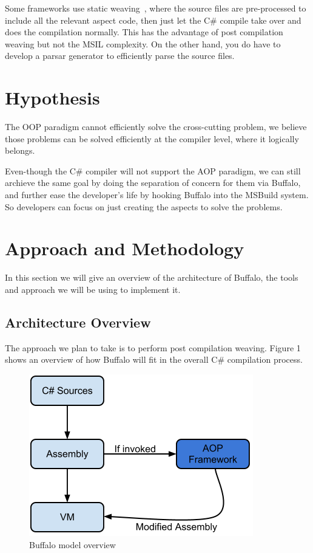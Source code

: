 Some frameworks use static weaving~\cite{aspectcs}, where the source files are pre-processed to include all the relevant aspect code, then just let the C\# compile take over and does the compilation normally. This has the advantage of post compilation weaving but not the MSIL complexity. On the other hand, you do have to develop a parsar generator to efficiently parse the source files.

\section{Hypothesis}
The OOP paradigm cannot efficiently solve the cross-cutting problem, we believe those problems can be solved efficiently at the compiler level, where it logically belongs.

Even-though the C\# compiler will not support the AOP paradigm, we can still archieve the same goal by doing the separation of concern for them via Buffalo, and further ease the developer's life by hooking Buffalo into the MSBuild system. So developers can focus on just creating the aspects to solve the problems.

\section{Approach and Methodology}
In this section we will give an overview of the architecture of Buffalo, the tools and approach we will be using to implement it.

\subsection{Architecture Overview}
The approach we plan to take is to perform post compilation weaving. Figure 1 shows an overview of how Buffalo will fit in the overall C\# compilation process.

\begin{figure}[here]
  \includegraphics[scale=0.70]{model_overview.png}
  \caption{Buffalo model overview\label{buffalo_model}}
\end{figure}

